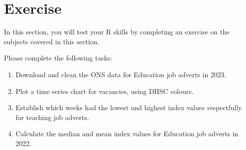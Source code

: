 \documentclass[
]{book}
\begin{document}
\hypertarget{exercise}{%
\chapter{Exercise}\label{exercise}}

In this section, you will test your R skills by completing an exercise on the subjects covered in this section.

Please complete the following tasks:

\begin{enumerate}
\def\labelenumi{\arabic{enumi}.}
\item
  Download and clean the ONS data for Education job adverts in 2023.
\item
  Plot a time series chart for vacancies, using DHSC colours.
\item
  Establish which weeks had the lowest and highest index values respectfully for teaching job adverts.
\item
  Calculate the median and mean index values for Education job adverts in 2022.
\end{enumerate}

  
\end{document}

